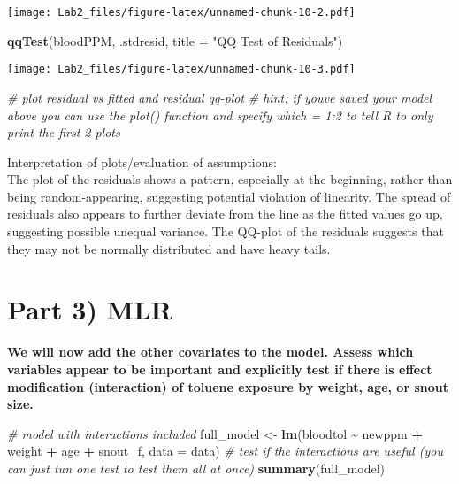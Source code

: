 \documentclass[
]{article}
\newenvironment{Shaded}{\begin{snugshade}}{\end{snugshade}}
\newcommand{\AttributeTok}[1]{\textcolor[rgb]{0.13,0.29,0.53}{#1}}
\newcommand{\CommentTok}[1]{\textcolor[rgb]{0.56,0.35,0.01}{\textit{#1}}}
\newcommand{\FunctionTok}[1]{\textcolor[rgb]{0.13,0.29,0.53}{\textbf{#1}}}
\newcommand{\NormalTok}[1]{#1}
\newcommand{\OtherTok}[1]{\textcolor[rgb]{0.56,0.35,0.01}{#1}}
\newcommand{\SpecialCharTok}[1]{\textcolor[rgb]{0.81,0.36,0.00}{\textbf{#1}}}
\newcommand{\StringTok}[1]{\textcolor[rgb]{0.31,0.60,0.02}{#1}}
\begin{document}
\texttt{[image: Lab2\_files/figure-latex/unnamed-chunk-10-2.pdf]}

\begin{Shaded}
\begin{Highlighting}[]
\FunctionTok{qqTest}\NormalTok{(bloodPPM, .stdresid, }\AttributeTok{title =} \StringTok{"QQ Test of Residuals"}\NormalTok{)}
\end{Highlighting}
\end{Shaded}

\texttt{[image: Lab2\_files/figure-latex/unnamed-chunk-10-3.pdf]}

\begin{Shaded}
\begin{Highlighting}[]
\CommentTok{\# plot residual vs fitted and residual qq{-}plot}
\CommentTok{\# hint: if you\textquotesingle{}ve saved your model above you can use the plot() function and specify which = 1:2 to tell R to only print the first 2 plots}
\end{Highlighting}
\end{Shaded}

Interpretation of plots/evaluation of assumptions:\\
The plot of the residuals shows a pattern, especially at the beginning,
rather than being random-appearing, suggesting potential violation of
linearity. The spread of residuals also appears to further deviate from
the line as the fitted values go up, suggesting possible unequal
variance. The QQ-plot of the residuals suggests that they may not be
normally distributed and have heavy tails.

\section{Part 3) MLR}\label{part-3-mlr}

\textbf{We will now add the other covariates to the model. Assess which
variables appear to be important and explicitly} \textbf{test if there
is effect modification (interaction) of toluene exposure by weight, age,
or snout size.}

\begin{Shaded}
\begin{Highlighting}[]
\CommentTok{\# model with interactions included}
\NormalTok{full\_model }\OtherTok{\textless{}{-}} \FunctionTok{lm}\NormalTok{(bloodtol }\SpecialCharTok{\textasciitilde{}}\NormalTok{ newppm }\SpecialCharTok{+}\NormalTok{ weight }\SpecialCharTok{+}\NormalTok{ age }\SpecialCharTok{+}\NormalTok{ snout\_f, }\AttributeTok{data =}\NormalTok{ data)}
\CommentTok{\# test if the interactions are useful (you can just tun one test to test them all at once)}
\FunctionTok{summary}\NormalTok{(full\_model)}
\end{Highlighting}
\end{Shaded}
\end{document}
